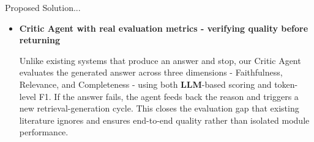 \begin{frame}{Proposed Solution...}
    \begin{itemize}
        \item \textbf{Critic Agent with real evaluation metrics - verifying quality before returning}
        
        Unlike existing systems that produce an answer and stop, our Critic Agent evaluates the generated answer across three dimensions - Faithfulness, Relevance, and Completeness - using both \textbf{LLM}-based scoring and token-level F1. If the answer fails, the agent feeds back the reason and triggers a new retrieval-generation cycle. This closes the evaluation gap that existing literature ignores and ensures end-to-end quality rather than isolated module performance.
    \end{itemize}
\end{frame}